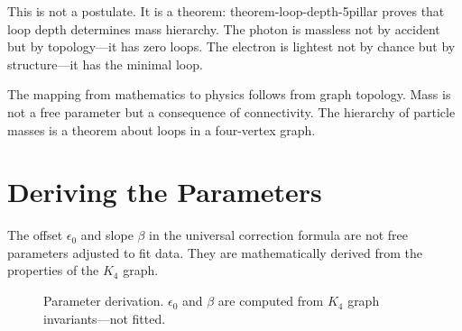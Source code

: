 \documentclass[11pt,a4paper]{book}
\def\cdot{.}%
\def\texttt#1{#1}%
\begin{document}
This is not a postulate. It is a theorem: \texttt{theorem-loop-depth-5pillar} proves that loop depth determines mass hierarchy. The photon is massless not by accident but by topology---it has zero loops. The electron is lightest not by chance but by structure---it has the minimal loop.

The mapping from mathematics to physics follows from graph topology. Mass is not a free parameter but a consequence of connectivity. The hierarchy of particle masses is a theorem about loops in a four-vertex graph.

\chapter{Deriving the Parameters}

The offset $\epsilon_0$ and slope $\beta$ in the universal correction formula are not free parameters adjusted to fit data.
They are mathematically derived from the properties of the $K_4$ graph.

\begin{figure}[h]
\centering
{}
\caption{Parameter derivation. $\epsilon_0$ and $\beta$ are computed from $K_4$ graph invariants—not fitted.}
\label{fig:parameter-derivation}
\end{figure}
\end{document}
